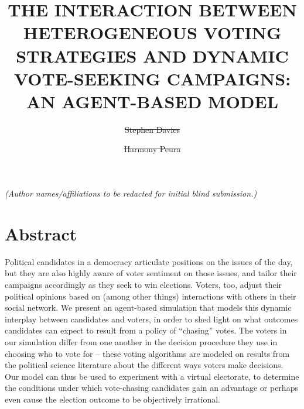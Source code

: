 \documentclass{scspaperproc}
\begin{document}

\def\SCSconferencename{Annual Simulation Conference}

\def\SCSconferenceacro{ANNSIM'24}

\def\SCSpublicationyear{2024}

\def\SCSconferenceeditors{P.J. Giabbanelli, I. David, C. Ruiz-Martin, B. Oakes and R. C\'{a}rdenas}

\def\SCSconferencedates{May 20-23}

\def\SCSconferencevenue{American University, DC, USA}

\title{THE INTERACTION BETWEEN HETEROGENEOUS VOTING STRATEGIES AND DYNAMIC
VOTE-SEEKING CAMPAIGNS: AN AGENT-BASED MODEL}

\textit{(Author names/affiliations to be redacted for initial blind submission.)}
\author[\authorrefmark{1}]{\sout{Stephen Davies}}
\author[\authorrefmark{1}]{\sout{Harmony Peura}}



\maketitle

\section*{Abstract}

Political candidates in a democracy articulate positions on the issues of the
day, but they are also highly aware of voter sentiment on those issues, and
tailor their campaigns accordingly as they seek to win elections. Voters, too,
adjust their political opinions based on (among other things) interactions with
others in their social network. We present an agent-based simulation that
models this dynamic interplay between candidates and voters, in order to shed
light on what outcomes candidates can expect to result from a policy of
``chasing'' votes. The voters in our simulation differ from one another in the
decision procedure they use in choosing who to vote for -- these voting
algorithms are modeled on results from the political science literature about
the different ways voters make decisions. Our model can thus be used to
experiment with a virtual electorate, to determine the conditions under which
vote-chasing candidates gain an advantage or perhaps even cause the election
outcome to be objectively irrational.
\end{document}
